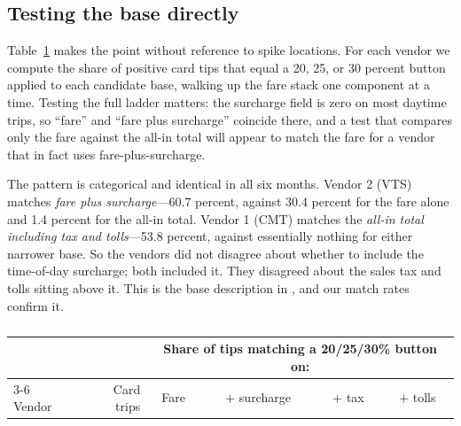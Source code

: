 \subsection{Testing the base directly}
Table~\ref{tab:hp-base} makes the point without reference to spike
locations. For each vendor we compute the share of positive card tips
that equal a 20, 25, or 30 percent button applied to each candidate
base, walking up the fare stack one component at a time. Testing the
full ladder matters: the surcharge field is zero on most daytime trips,
so ``fare'' and ``fare plus surcharge'' coincide there, and a test that
compares only the fare against the all-in total will appear to match the
fare for a vendor that in fact uses fare-plus-surcharge.

The pattern is categorical and identical in all six months. Vendor 2
(VTS) matches \emph{fare plus surcharge}---60.7 percent, against 30.4
percent for the fare alone and 1.4 percent for the all-in total. Vendor
1 (CMT) matches the \emph{all-in total including tax and
tolls}---53.8 percent, against essentially nothing for either narrower
base. So the vendors did not disagree about whether to include the
time-of-day surcharge; both included it. They disagreed about the sales
tax and tolls sitting above it. This is the base description in
\textcite{thakral2026five}, and our match rates confirm it.

\begin{table}[!htbp]
  \centering
  \singlespacing
  \caption{}
  \label{tab:hp-base}
  \small
  \begin{tabular}{@{}lrcccc@{}}
    \toprule
    & & \multicolumn{4}{c}{Share of tips matching a 20/25/30\% button on:} \\
    \cmidrule(lr){3-6}
    Vendor & Card trips & Fare & $+$ surcharge & $+$ tax & $+$ tolls \\
    \midrule
    
    \bottomrule
  \end{tabular}
\end{table}

